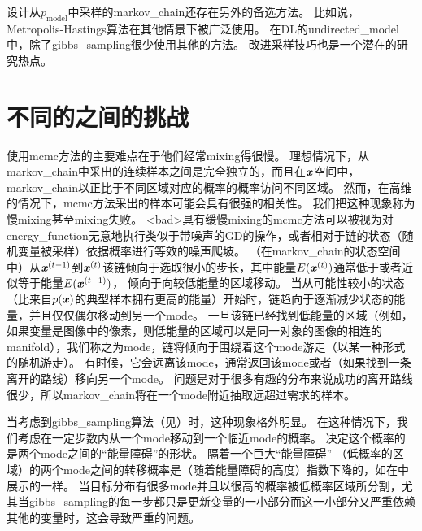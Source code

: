 设计从$p_{\text{model}}$中采样的\gls{markov_chain}还存在另外的备选方法。
比如说，Metropolis-Hastings算法在其他情景下被广泛使用。
在\gls{DL}的\gls{undirected_model}中，除了\gls{gibbs_sampling}很少使用其他的方法。
改进采样技巧也是一个潜在的研究热点。


\section{不同的之间的挑战}
\label{sec:the_challenge_of_mixing_between_separated_modes}

使用\gls{mcmc}方法的主要难点在于他们经常\gls{mixing}得很慢。
理想情况下，从\gls{markov_chain}中采出的连续样本之间是完全独立的，而且在$\boldsymbol{\mathit{x}}$空间中，\gls{markov_chain}以正比于不同区域对应的概率的概率访问不同区域。
然而，在高维的情况下，\gls{mcmc}方法采出的样本可能会具有很强的相关性。
我们把这种现象称为慢\gls{mixing}甚至\gls{mixing}失败。
<bad>具有缓慢\gls{mixing}的\gls{mcmc}方法可以被视为对\gls{energy_function}无意地执行类似于带噪声的\gls{GD}的操作，或者相对于链的状态（随机变量被采样）依据概率进行等效的噪声爬坡。
（在\gls{markov_chain}的状态空间中）从$\boldsymbol{\mathit{x}}^{(t-1)}$到$\boldsymbol{\mathit{x}}^{(t)}$该链倾向于选取很小的步长，其中能量$E(\boldsymbol{\mathit{x}}^{(t)})$通常低于或者近似等于能量$E(\boldsymbol{\mathit{x}}^{(t-1)})$，
倾向于向较低能量的区域移动。
当从可能性较小的状态（比来自$p(\boldsymbol{\mathit{x}})$的典型样本拥有更高的能量）开始时，链趋向于逐渐减少状态的能量，并且仅仅偶尔移动到另一个\gls{mode}。
一旦该链已经找到低能量的区域（例如，如果变量是图像中的像素，则低能量的区域可以是同一对象的图像的相连的\gls{manifold}），我们称之为\gls{mode}，链将倾向于围绕着这个\gls{mode}游走（以某一种形式的随机游走）。
有时候，它会远离该\gls{mode}，通常返回该\gls{mode}或者（如果找到一条离开的路线）移向另一个\gls{mode}。
问题是对于很多有趣的分布来说成功的离开路线很少，所以\gls{markov_chain}将在一个\gls{mode}附近抽取远超过需求的样本。


当考虑到\gls{gibbs_sampling}算法（见）时，这种现象格外明显。
在这种情况下，我们考虑在一定步数内从一个\gls{mode}移动到一个临近\gls{mode}的概率。
决定这个概率的是两个\gls{mode}之间的``能量障碍''的形状。
隔着一个巨大``能量障碍'' （低概率的区域）的两个\gls{mode}之间的转移概率是（随着能量障碍的高度）指数下降的，如在中展示的一样。
当目标分布有很多\gls{mode}并且以很高的概率被低概率区域所分割，尤其当\gls{gibbs_sampling}的每一步都只是更新变量的一小部分而这一小部分又严重依赖其他的变量时，这会导致严重的问题。


